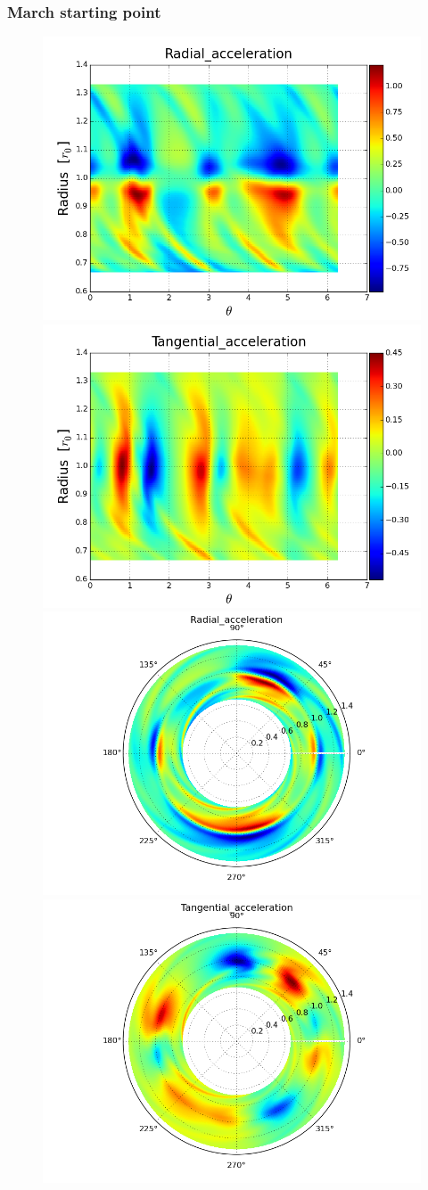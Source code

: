 \documentclass{beamer}
\newcommand\Fontvi{\fontsize{6}{7.2}\selectfont}
\begin{document}
\begin{frame}
\frametitle{March starting point}
\Fontvi

\begin{figure}
\includegraphics[width = .5\textwidth]{./Radial_acceleration_linear.png}
\includegraphics[width = .5\textwidth]{./Tangential_acceleration_linear.png} 
\newline   
\includegraphics[width = .5\textwidth]{./Radial_acceleration_polar.png}
\includegraphics[width = .5\textwidth]{./Tangential_acceleration_polar.png}
\end{figure}

\end{frame}
\end{document}
